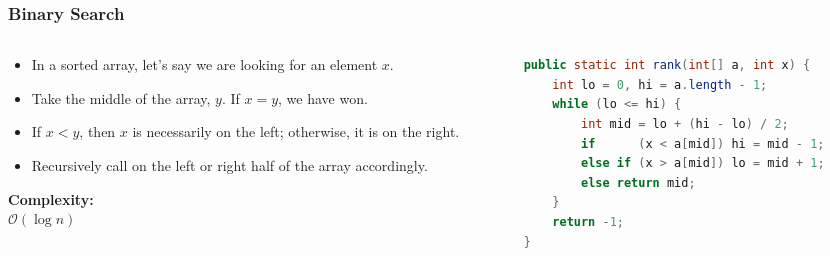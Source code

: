 \documentclass[8pt,aspectratio=169]{beamer}
\begin{document}
\begin{frame}[fragile]
\frametitle{Binary Search}

\begin{columns}[T]

    \begin{column}{0.48\textwidth}
        \begin{itemize}
            \item In a sorted array, let's say we are looking for an element $x$.
            \item Take the middle of the array, $y$. If $x=y$, we have won.
            \item If $x < y$, then $x$ is necessarily on the left; otherwise, it is on the right.
            \item Recursively call on the left or right half of the array accordingly.
        \end{itemize}
        
        \vspace{1em}
        \textbf{Complexity:} \\
        $\mathcal{O}(\log n)$
    \end{column}

    \begin{column}{0.48\textwidth}
\begin{lstlisting}[language=Java, basicstyle=\tiny\ttfamily, keywordstyle=\color{blue}, frame=single]
public static int rank(int[] a, int x) {
    int lo = 0, hi = a.length - 1;
    while (lo <= hi) {
        int mid = lo + (hi - lo) / 2;
        if      (x < a[mid]) hi = mid - 1;
        else if (x > a[mid]) lo = mid + 1;
        else return mid;
    }
    return -1;
}
\end{lstlisting}
    \end{column}
\end{columns}
\end{frame}
\end{document}
